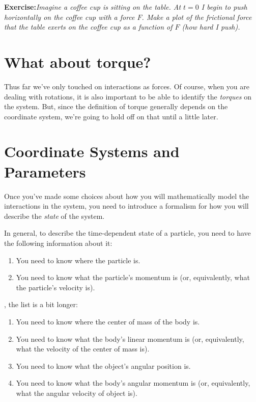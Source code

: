 {\bf Exercise:}{\it Imagine a coffee cup is sitting on the table.  At $t=0$ I begin to push horizontally on the coffee cup with a force $F$.  Make a plot of the frictional force that the table exerts on the coffee cup as a function of $F$ (how hard I push).}

\section{What about torque?}

Thus far we've only touched on interactions as forces.  Of course, when you are dealing with rotations, it is also important to be able to identify the {\it torques} on the system.  But, since the definition of torque generally depends on the coordinate system, we're going to hold off on that until a little later. 


\section{Coordinate Systems and Parameters}
Once you've made some choices about how you will mathematically model the interactions in the system, you need to introduce a formalism for how you will describe the {\it state} of the system.  

In general, to describe the time-dependent state of a particle, you need to have the following information about it:

\begin{enumerate}
\item You need to know where the particle is.
\item You need to know what the particle's momentum is (or, equivalently, what the particle's velocity is).
\end{enumerate}

, the list is a bit longer:
\begin{enumerate}
\item You need to know where the center of mass of the body is.
\item You need to know what the body's linear momentum is (or, equivalently, what the velocity of the center of mass is).
\item You need to know what the object's angular position is.
\item You need to know what the body's angular momentum is (or, equivalently, what the angular velocity of object is).
\end{enumerate}

